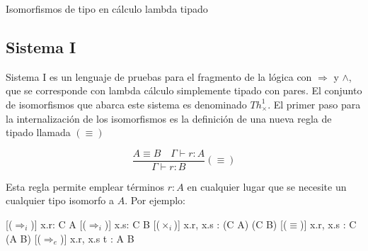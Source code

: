 \documentclass[]{report}
\begin{document}
\begin{table}[ht!]
\begin{minipage}{0.7\linewidth}
		\end{minipage}
		\caption{Isomorfismos de tipo en cálculo lambda tipado}
	\end{table}
	
	\subsection{Sistema I}
	Sistema I \cite{system-i} es un lenguaje de pruebas para el fragmento de la lógica con $\Rightarrow$ y $\wedge$, que se corresponde con lambda cálculo simplemente tipado con pares.
	El conjunto de isomorfismos que abarca este sistema es denominado $Th^1_\times$.
	El primer paso para la internalización de los isomorfismos es la definición de una nueva regla de tipado llamada $(\equiv)$
	
	\[ \frac{A \equiv B \quad \Gamma \vdash r:A}{\Gamma \vdash r:B} (\equiv) \]
	
	Esta regla permite emplear términos $r:A$ en cualquier lugar que se necesite un cualquier tipo isomorfo a $A$. Por ejemplo:
	
	\begin{prooftree*}
		[($\Rightarrow_i$)]{ \Gamma\vdash \lambda x.r: C \Rightarrow A }
		[($\Rightarrow_i$)]{ \Gamma\vdash \lambda x.s: C \Rightarrow B }
		[($\times_i$)]{ \Gamma\vdash \langle \lambda x.r, \lambda x.s \rangle : (C \Rightarrow A) \times (C \Rightarrow B) }
		[($\equiv$)]{ \Gamma\vdash \langle \lambda x.r, \lambda x.s \rangle : C \Rightarrow (A \times B) }
		[($\Rightarrow_e$)]{ \Gamma\vdash \langle \lambda x.r, \lambda x.s \rangle \; t : A \times B }
	\end{prooftree*}
	
\end{document}
